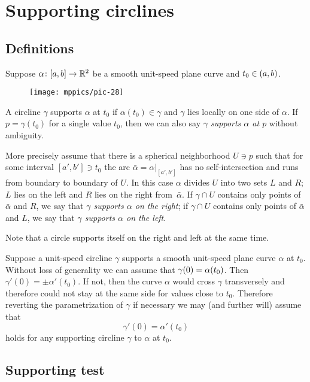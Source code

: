 \chapter{Supporting circlines}

\section{Definitions}

Suppose $\alpha\colon[a,b]\to\mathbb{R}^2$ be a smooth unit-speed plane curve and $t_0\z\in(a,b)$.

\begin{wrapfigure}{r}{43 mm}
\vskip-4mm
\centering
\texttt{[image: mppics/pic-28]}
\vskip0mm
\end{wrapfigure}

A circline $\gamma$ supports $\alpha$ at $t_0$ if $\alpha(t_0)\in\gamma$
and $\gamma$ lies locally on one side of $\alpha$.
If $p=\gamma(t_0)$ for a single value $t_0$,
then we can also say \emph{$\gamma$ supports $\alpha$ at $p$} without ambiguity.

More precisely assume that there is a spherical neighborhood $U\ni p$ such that for some interval $[a',b']\ni t_0$
the arc $\bar\alpha=\alpha|_{[a',b']}$ has no self-intersection and runs from boundary to boundary of $U$.
In this case $\alpha$ divides $U$ into two sets  $L$ and $R$;
$L$ lies on the left and $R$ lies on the right from~$\bar\alpha$.
If $\gamma\cap U$ contains only points of $\bar\alpha$ and $R$, we say that \emph{$\gamma$ supports $\alpha$ on the right};
if $\gamma\cap U$ contains only points of $\bar\alpha$ and $L$, we say that \emph{$\gamma$ supports $\alpha$ on the left}.



Note that a circle supports itself on the right and left at the same time.

Suppose a unit-speed circline $\gamma$ supports a smooth unit-speed plane curve $\alpha$ at $t_0$.
Without loss of generality we can assume that $\gamma(0)\z=\alpha(t_0)$. 
Then $\gamma'(0)=\pm\alpha'(t_0)$.
If not, then the curve $\alpha$ would cross $\gamma$ transversely and therefore could not stay at the same side for values close to $t_0$.
Therefore reverting the parametrization of $\gamma$ if necessary we may (and further will) assume that 
\[\gamma'(0)=\alpha'(t_0)\]
holds for any supporting circline $\gamma$ to $\alpha$ at $t_0$.

\section{Supporting test}

